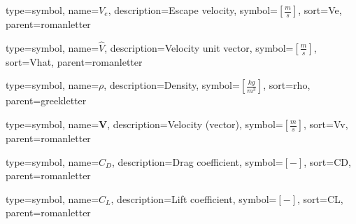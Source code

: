 {
type=symbol, %
name={\ensuremath{V_e}}, %
description={Escape velocity}, %
symbol={$\left[\frac{m}{s}\right]$}, %
sort=Ve, %
parent=romanletter %
}

{
	type=symbol, %
	name={\ensuremath{\hat{V}}}, %
	description={Velocity unit vector}, %
	symbol={$\left[\frac{m}{s}\right]$}, %
	sort=Vhat, %
	parent=romanletter %
}

{
type=symbol, %
name={\ensuremath{\rho}}, %
description={Density}, %
symbol={$\left[\frac{kg}{m^3}\right]$}, %
sort=rho, %
parent=greekletter %
}

{
type=symbol, %
name={\ensuremath{\mathbf{V}}}, %
description={Velocity (vector)}, %
symbol={$\left[\frac{m}{s}\right]$}, %
sort=Vv, %
parent=romanletter %
}

{
type=symbol, %
name={\ensuremath{C_D}}, %
description={Drag coefficient}, %
symbol={$\left[-\right]$}, %
sort=CD, %
parent=romanletter %
}

{
type=symbol, %
name={\ensuremath{C_L}}, %
description={Lift coefficient}, %
symbol={$\left[-\right]$}, %
sort=CL, %
parent=romanletter %
}

